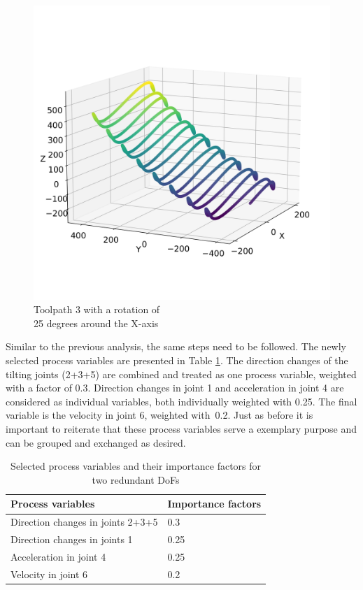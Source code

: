 \begin{figure}[H]
\begin{minipage}{0.5\textwidth}
		\includegraphics[width=\textwidth]{figures/path3_kipp_25_comparison.png}
		\caption{Toolpath 3 with a rotation of\\ 25 degrees around the X-axis}
		\label{TP3_25}
	\end{minipage}\par
\end{figure}
 

Similar to the previous analysis, the same steps need to be followed. The newly selected process variables are presented in Table \ref{PP_2}. The direction changes of the tilting joints (2+3+5) are combined and treated as one process variable, weighted with a factor of 0.3. Direction changes in joint 1 and acceleration in joint 4 are considered as individual variables, both individually weighted with 0.25. The final variable is the velocity in joint 6, weighted with~0.2. Just as before it is important to reiterate that these process variables serve a exemplary purpose and can be grouped and exchanged as desired.

\begin{table}[H]
	\centering
	\caption{Selected process variables and their importance factors for two redundant DoFs}
	\begin{tabular}{||l|l||}
		Process variables & Importance factors \\
		\hline
		\hline
		\hline
		Direction changes in joints 2+3+5	&		0.3 \\
		Direction changes in joints 1	& 	0.25 \\
		Acceleration in joint 4	& 		0.25\\
		Velocity in joint 6	& 		0.2\\
		\hline
		\hline
	\end{tabular}
	
	
	\label{PP_2}
\end{table}


